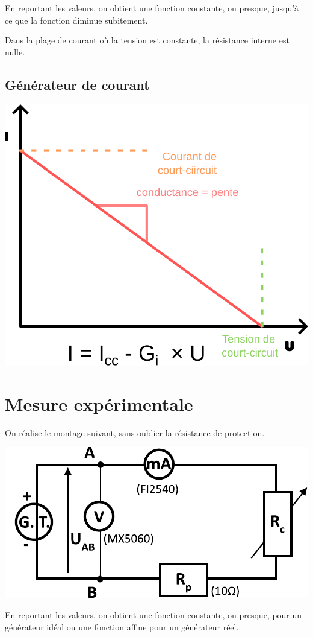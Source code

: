 \documentclass[french]{yLectureNote}
\begin{document}
En reportant les valeurs, on obtient une fonction constante, ou presque, jusqu'à ce que la fonction diminue subitement.

Dans la plage de courant où la tension est constante, la résistance interne est nulle.

\subsection{Générateur de courant}
\includegraphics[scale=0.5]{courant}
\section{Mesure expérimentale}
On réalise le montage suivant, sans oublier la résistance de protection.

\includegraphics{circuit}

En reportant les valeurs, on obtient une fonction constante, ou presque, pour un générateur idéal ou une fonction affine pour un générateur réel.
\end{document}
